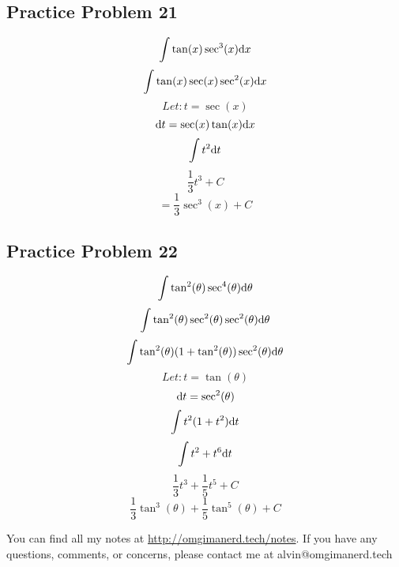 \documentclass[letterpaper, 12pt]{math}
\begin{document}
\subsection*{Practice Problem 21}
\[ \int{\tan(x)\sec^{3}(x)\mathrm{d}{x}} \]
\[ \int{\tan(x)\sec(x)\sec^{2}(x)\mathrm{d}{x}} \]
\[ Let: t = \sec(x) \]
\[ \mathrm{d}{t} = \sec(x)\tan(x)\mathrm{d}{x} \]
\[ \int{t^{2}\mathrm{d}{t}} \]
\[ \frac{1}{3}t^{3}+C \]
\[ = \frac{1}{3}\sec^{3}(x)+C \]

\subsection*{Practice Problem 22}
\[ \int{\tan^{2}(\theta)\sec^{4}(\theta)\mathrm{d}{\theta}} \]
\[ \int{\tan^{2}(\theta)\sec^{2}(\theta)\sec^{2}(\theta)\mathrm{d}{\theta}} \]
\[ \int{\tan^{2}(\theta)(1+\tan^{2}(\theta))\sec^{2}(\theta)\mathrm{d}{\theta}} \]
\[ Let: t = \tan(\theta) \]
\[ \mathrm{d}{t} = \sec^{2}(\theta) \]
\[ \int{t^{2}(1+t^{2})\mathrm{d}{t}} \]
\[ \int{t^{2}+t^{6}\mathrm{d}{t}} \]
\[ \frac{1}{3}t^{3}+\frac{1}{5}t^{5}+C \]
\[ \frac{1}{3}\tan^{3}(\theta)+\frac{1}{5}\tan^{5}(\theta)+C \]

\begin{center}
  You can find all my notes at \url{http://omgimanerd.tech/notes}. If you have
  any questions, comments, or concerns, please contact me at
  alvin@omgimanerd.tech
\end{center}
\end{document}
